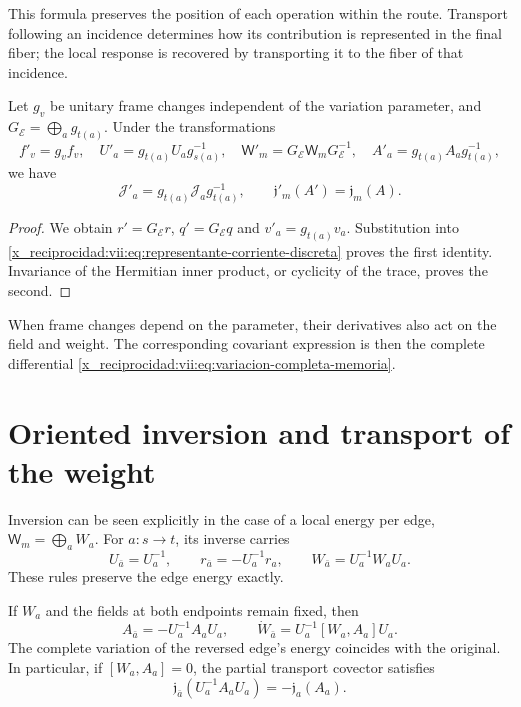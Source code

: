 This formula preserves the position of each operation within the route.
Transport following an incidence determines how
its contribution is represented in the final fiber; the local response is recovered
by transporting it to the fiber of that incidence.

\begin{proposition}
\label{x_reciprocidad:vii:prop:covariancia-corriente-memoria}
Let \(g_v\) be unitary frame changes independent of the variation
parameter, and \(G_{\mathcal E}=\bigoplus_a g_{t(a)}\).
Under the transformations
\[
 f'_v=g_vf_v,\quad U'_a=g_{t(a)}U_ag_{s(a)}^{-1},\quad
 \mathsf W'_m=G_{\mathcal E}\mathsf W_mG_{\mathcal E}^{-1},\quad
 A'_a=g_{t(a)}A_ag_{t(a)}^{-1},
\]
we have
\begin{equation}
 \mathcal J'_a=g_{t(a)}\mathcal J_ag_{t(a)}^{-1},
 \qquad \mathfrak j'_m(A')=\mathfrak j_m(A).
 \label{x_reciprocidad:vii:eq:covariancia-respuesta}
\end{equation}
\end{proposition}

\begin{proof}
We obtain \(r'=G_{\mathcal E}r\), \(q'=G_{\mathcal E}q\) and
\(v'_a=g_{t(a)}v_a\). Substitution into
\eqref{x_reciprocidad:vii:eq:representante-corriente-discreta} proves the first
identity. Invariance of the Hermitian inner product, or cyclicity of
the trace, proves the second.
\end{proof}

When frame changes depend on the parameter, their derivatives
also act on the field and weight. The corresponding covariant
expression is then the complete differential
\eqref{x_reciprocidad:vii:eq:variacion-completa-memoria}.

\section{Oriented inversion and transport of the weight}
\label{x_reciprocidad:vii:subsec:inversion-respuesta}

Inversion can be seen explicitly in the case of a local energy
per edge, \(\mathsf W_m=\bigoplus_a W_a\).
For \(a:s\to t\), its inverse carries
\[
 U_{\bar a}=U_a^{-1},\qquad
 r_{\bar a}=-U_a^{-1}r_a,\qquad
 W_{\bar a}=U_a^{-1}W_aU_a.
\]
These rules preserve the edge energy exactly.

\begin{proposition}
\label{x_reciprocidad:vii:prop:inversion-respuesta}
If \(W_a\) and the fields at both endpoints remain fixed, then
\[
 A_{\bar a}=-U_a^{-1}A_aU_a,\qquad
 \dot W_{\bar a}=U_a^{-1}[W_a,A_a]U_a.
\]
The complete variation of the reversed edge's energy coincides with
the original. In particular, if \([W_a,A_a]=0\), the partial transport
covector satisfies
\begin{equation}
 \mathfrak j_{\bar a}(U_a^{-1}A_aU_a)
 =-\mathfrak j_a(A_a).
 \label{x_reciprocidad:vii:eq:imparidad-transporte}
\end{equation}
\end{proposition}

